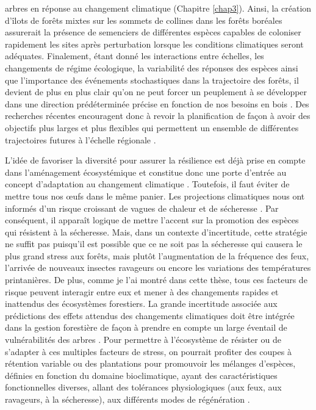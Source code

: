 arbres en réponse au changement climatique (Chapitre \ref{chap3}).
Ainsi, la création d'îlots de forêts mixtes sur les sommets de collines
dans les forêts boréales assurerait la présence de semenciers de
différentes espèces capables de coloniser rapidement les sites après
perturbation lorsque les conditions climatiques seront adéquates.
Finalement, étant donné les interactions entre échelles, les changements
de régime écologique, la variabilité des réponses des espèces ainsi que
l'importance des événements stochastiques dans la trajectoire des
forêts, il devient de plus en plus clair qu'on ne peut forcer un
peuplement à se développer dans une direction prédéterminée précise en
fonction de nos besoins en bois \citep{puettmann_critique_2009}. Des
recherches récentes encouragent donc à revoir la planification de façon
à avoir des objectifs plus larges et plus flexibles qui permettent un
ensemble de différentes trajectoires futures à l'échelle régionale
\citep{messier_dealing_2016, puettmann_critique_2009}.

L'idée de favoriser la diversité pour assurer la résilience est déjà
prise en compte dans l'aménagement écosystémique et constitue donc une
porte d'entrée au concept d'adaptation au changement climatique
\citep{samuel_foret_2011}. Toutefois, il faut éviter de mettre tous nos
\oe{}ufs dans le même panier. Les projections climatiques nous ont
informés d'un risque croissant de vagues de chaleur et de sécheresse
\citep{ipcc_climate_2014}. Par conséquent, il apparaît logique de mettre
l'accent sur la promotion des espèces qui résistent à la sécheresse.
Mais, dans un contexte d'incertitude, cette stratégie ne suffit pas
puisqu'il est possible que ce ne soit pas la sécheresse qui causera le
plus grand stress aux forêts, mais plutôt l'augmentation de la fréquence
des feux, l'arrivée de nouveaux insectes ravageurs ou encore les
variations des températures printanières. De plus, comme je l'ai montré
dans cette thèse, tous ces facteurs de risque peuvent interagir entre
eux et mener à des changements rapides et inattendus des écosystèmes
forestiers. La grande incertitude associée aux prédictions des effets
attendus des changements climatiques doit être intégrée dans la gestion
forestière de façon à prendre en compte un large éventail de
vulnérabilités des arbres \citep{messier_dealing_2016}. Pour permettre à
l'écosystème de résister ou de s'adapter à ces multiples facteurs de
stress, on pourrait profiter des coupes à rétention variable ou des
plantations pour promouvoir les mélanges d'espèces, définies en fonction
du domaine bioclimatique, ayant des caractéristiques fonctionnelles
diverses, allant des tolérances physiologiques (aux feux, aux ravageurs,
à la sécheresse), aux différents modes de régénération \citep[e.g.,
banque de graines, cônes sérotineux, reproduction
végétative;][]{messier_functional_2019, puettmann_critique_2009}.

